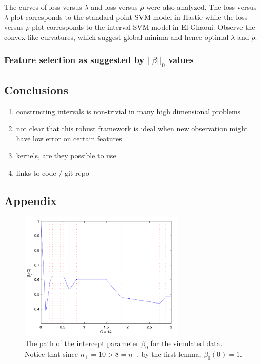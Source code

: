 \documentclass[10pt]{article}
\theoremstyle{definition}
\begin{document}
The curves of loss versus $\lambda$ and loss versus $\rho$ were also analyzed.  The loss versus $\lambda$ plot corresponds to the standard point SVM model in Hastie while the loss versus $\rho$ plot corresponds to the interval SVM model in El Ghaoui. Observe the convex-like curvatures, which suggest global minima and hence optimal $\lambda$ and $\rho$. 

\subsubsection{Feature selection as suggested by $||\beta||_0$ values}



\subsection{Conclusions}
\begin{enumerate}
\item constructing intervals is non-trivial in many high dimensional problems
\item not clear that this robust framework is ideal when new observation might have low error on certain features
\item kernels, are they possible to use
\item links to code / git repo
\end{enumerate}


\subsection{Appendix}
\begin{center}
\begin{figure}[!h]
   \centering
   \includegraphics[width=0.7\textwidth]{./beta0Path.pdf} 
      \caption{The path of the intercept parameter $\beta_0$ for the simulated data. Notice that since $n_+=10>8=n_-$, by the first lemma, $\beta_0(0)=1$.}
   \label{fig:beta0Path}
\end{figure}
\end{center}
\end{document}

